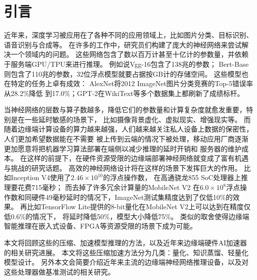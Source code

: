 \section{引言}
近年来，深度学习被应用在了各种不同的应用领域上，比如图片分类、目标识别、语音识别与合成等。
在许多的工作中，研究员们构建了庞大的神经网络来尝试解决一个领域内的问题。
这些网络包含了数以百万计甚至十亿计的参数量，并依赖于服务端GPU/TPU来进行推理。
例如说Vgg-16\cite{simonyan2014very}包含了138兆的参数；
Bert-Base\cite{devlin2018bert}则包含了110兆的参数，32位浮点模型就要占据按GB计的存储空间。
这些模型也在特定的任务上卓有成效：
AlexNet\cite{krizhevsky2012imagenet}将2012 ImageNet\cite{deng2009imagenet}图片分类竞赛的Top-5错误率从28.2\%降低
到17.0\%；GPT-2\cite{radford2019language}在WikiText等多个数据集上都刷新了成绩标杆。

当神经网络的层数与算子数越多，降低它们的参数量和计算复杂度就愈发重要，特别是在一些延时敏感的场景下，
比如摄像背景虚化、虚拟现实、增强现实等。
而随着边缘端计算设备的算力越来越强，人们越来越关注私人设备上数据的保密性，人们更加希望数据能在不需要
被上传到云端的情况下被处理，移动应用厂商逐渐更加愿意将把机器学习算法部署在端侧以减少推理的延时开销和
服务器的维护成本。
在这样的前提下，在硬件资源受限的边缘端部署神经网络就变成了富有机遇与挑战的研究话题。
高效的神经网络设计将在这样的场景下发挥巨大的作用。
比如Inception V4\cite{szegedy2017inception}使用了$2.46\times 10^{10}$的浮点操作数，
在高通骁龙855 SoC处理器上推理要花费715毫秒；
而去掉了许多冗余计算量的MobileNet V2\cite{sandler2018mobilenetv2}
在$6.0\times 10^8$浮点操作数和同硬件49毫秒延时的情况下，ImageNet测试集精度达到了仅低10\%的效果。
再比如TensorFlow Lite提供的8-bit量化在MobileNet V2上可以达到在精度仅低0.6\%的情况下，
将延时降低50\%，模型大小降低75\%。
类似的取舍使得边缘端智能推理在嵌入式设备、FPGA等资源受限的场景下成为可能。

本文将回顾这些的压缩、加速模型推理的方法，以及近年来边缘端硬件AI加速器的相关研究进展。
本文将这些压缩加速方法分为几类：量化、知识蒸馏、轻量化模型设计。
另外本文会简要介绍近年来主流的边缘端神经网络推理设备，以及对这些处理器做基准测试的相关研究。
